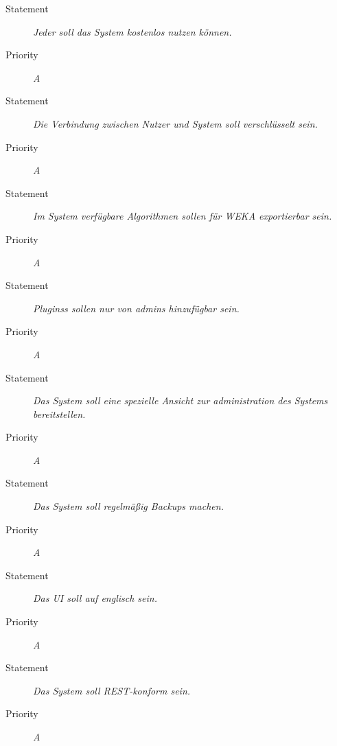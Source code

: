 \UR
\begin{description}
	\item[Statement] \textit{Jeder soll das System kostenlos nutzen können.}
	\item[Priority] \textit{A}
\end{description}


\UR
\begin{description}
	\item[Statement] \textit{Die Verbindung zwischen Nutzer und System soll verschlüsselt sein.}
	\item[Priority] \textit{A}
\end{description}


\UR
\begin{description}
	\item[Statement] \textit{Im System verfügbare Algorithmen sollen für WEKA exportierbar sein.}
	\item[Priority] \textit{A}
\end{description}


\UR
\begin{description}
	\item[Statement] \textit{\glspl{Plugins} sollen nur von \glspl{admin} hinzufügbar sein.}
	\item[Priority] \textit{A}
\end{description}


\UR
\begin{description}
	\item[Statement] \textit{Das System soll eine spezielle Ansicht zur administration des Systems bereitstellen.}
	\item[Priority] \textit{A}
\end{description}


\UR
\begin{description}
	\item[Statement] \textit{Das System soll regelmäßig \glspl{Backup} machen.}%
	\item[Priority] \textit{A}
\end{description}


\UR
\begin{description}
	\item[Statement] \textit{Das \gls{UI} soll auf englisch sein.}
	\item[Priority] \textit{A}
\end{description}


\UR
\begin{description}
	\item[Statement] \textit{Das System soll \gls{REST}-konform sein.}
	\item[Priority] \textit{A}
\end{description}

